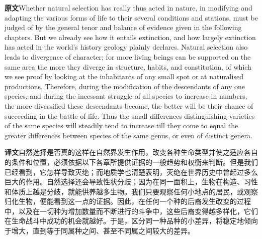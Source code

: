 \documentclass[UTF8,zihao=-4]{ctexart}
\newcommand{\BodyFont}{\fontsize{10.5pt}{15.5pt}\selectfont}
\newcommand{\origlabel}{\textbf{原文}\quad}
\newcommand{\translabel}{\textbf{译文}\quad}
\newenvironment{enblock}{\par\noindent\begingroup\BodyFont\origlabel}{\par\endgroup}
\newenvironment{zhblock}{\par\noindent\begingroup\BodyFont\translabel}{\par\endgroup\vspace{0.35em}}
\newcommand{\pair}[2]{\begin{enblock}#1\end{enblock}\begin{zhblock}#2\end{zhblock}}
\begin{document}
\pair{Whether natural selection has really thus acted in nature, in modifying and adapting the various forms of life to their several conditions and stations, must be judged of by the general tenor and balance of evidence given in the following chapters. But we already see how it entails extinction, and how largely extinction has acted in the world's history geology plainly declares. Natural selection also leads to divergence of character; for more living beings can be supported on the same area the more they diverge in structure, habits, and constitution, of which we see proof by looking at the inhabitants of any small spot or at naturalised productions. Therefore, during the modification of the descendants of any one species, and during the incessant struggle of all species to increase in numbers, the more diversified these descendants become, the better will be their chance of succeeding in the battle of life. Thus the small differences distinguishing varieties of the same species will steadily tend to increase till they come to equal the greater differences between species of the same genus, or even of distinct genera.}{自然选择是否真的这样在自然界发生作用，改变各种生命类型并使之适应各自的条件和位置，必须依据以下各章所提供证据的一般趋势和权衡来判断。但是我们已经看到，它怎样导致灭绝；而地质学也清楚表明，灭绝在世界历史中曾起过多么巨大的作用。自然选择还会导致性状分歧；因为在同一面积上，生物在构造、习性和体质上越是分歧，就能供养越多生物。我们只要观察任何小地点的居民，或观察归化生物，便能看到这一点的证据。因此，在任何一个种的后裔发生改变的过程中，以及在一切种为增加数量而不断进行的斗争中，这些后裔变得越多样化，它们在生命战斗中成功的机会就越好。于是，区分同一种品种的小差异，将稳定地倾向于增大，直到等于同属种之间、甚至不同属之间较大的差异。}
\end{document}
